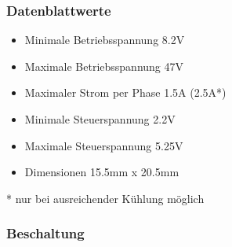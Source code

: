 \subsubsection{Datenblattwerte}

\begin{itemize}
    \item Minimale Betriebsspannung 8.2V
    \item Maximale Betriebsspannung 47V
    \item Maximaler Strom per Phase 1.5A (2.5A*)
    \item Minimale Steuerspannung 2.2V
    \item Maximale Steuerspannung 5.25V
    \item Dimensionen 15.5mm x 20.5mm
\end{itemize}
* nur bei ausreichender Kühlung möglich

\subsubsection{Beschaltung}

